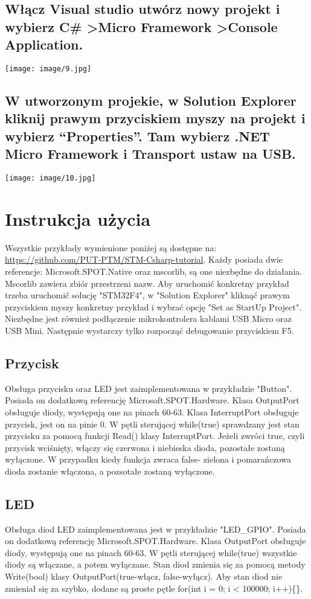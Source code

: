 ﻿\documentclass{article}
\begin{document}
\subsection{Włącz Visual studio utwórz nowy projekt i wybierz C\# \textgreater Micro Framework \textgreater Console Application.}

\texttt{[image: image/9.jpg]}
\subsection{W utworzonym projekie, w Solution Explorer kliknij prawym przyciskiem myszy na projekt i wybierz “Properties”. Tam wybierz .NET Micro Framework i Transport ustaw na USB.}
\texttt{[image: image/10.jpg]}

\section{Instrukcja użycia}
Wszystkie przykłady wymienione poniżej są dostępne na:  \href{https://github.com/PUT-PTM/STM-Csharp-tutorial}{https://github.com/PUT-PTM/STM-Csharp-tutorial}. Każdy posiada dwie referencje: Microsoft.SPOT.Native oraz mscorlib, są one niezbędne do działania. Mscorlib zawiera zbiór przestrzeni nazw. Aby uruchomić konkretny przykład trzeba uruchomić solucję "STM32F4", w "Solution Explorer" kliknąć prawym przyciskiem myszy konkretny przykład i wybrać opcję "Set as StartUp Project". Niezbędne jest również podłączenie mikrokontrolera kablami USB Micro oraz USB Mini. Następnie wystarczy tylko rozpocząć debugowanie przyciskiem F5.

\subsection{Przycisk}
Obsługa przycisku oraz LED jest zaimplementowana w przykładzie "Button". Posiada on dodatkową referencję Microsoft.SPOT.Hardware. Klasa OutputPort obsługuje diody, występują one na pinach 60-63. Klasa InterruptPort obsługuje przycisk, jest on na pinie 0. W pętli sterującej while(true) sprawdzany jest stan przycisku za pomocą funkcji Read() klasy InterruptPort. Jeżeli zwróci true, czyli przycisk wciśnięty, włączy się czerwona i niebieska dioda, pozostałe zostaną wyłączone. W przypadku kiedy funkcja zwraca false- zielona i pomarańczowa dioda zostanie włączona, a pozsotałe zostaną wyłączone.

\subsection{LED}
Obsługa diod LED zaimplementowana jest w przykładzie "LED\_GPIO". Posiada on dodatkową referencję Microsoft.SPOT.Hardware. Klasa OutputPort obsługuje diody, występują one na pinach 60-63. W pętli sterującej while(true) wszystkie diody są włączane, a potem wyłączane. Stan diod zmienia się za pomocą metody Write(bool) klasy OutputPort(true-włącz, false-wyłącz). Aby stan diod nie zmieniał się za szybko, dodane są proste pętle for(int i = 0; i < 100000; i++)\{\}.
\end{document}
